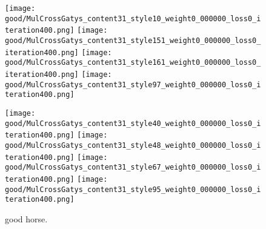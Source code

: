 \documentclass[runningheads]{llncs}
\begin{document}
\begin{figure*}[!htbp]
\centering
\small 

	\texttt{[image: good/MulCrossGatys\_content31\_style10\_weight0\_000000\_loss0\_iteration400.png]}
    \texttt{[image: good/MulCrossGatys\_content31\_style151\_weight0\_000000\_loss0\_iteration400.png]}
    \texttt{[image: good/MulCrossGatys\_content31\_style161\_weight0\_000000\_loss0\_iteration400.png]}
    \texttt{[image: good/MulCrossGatys\_content31\_style97\_weight0\_000000\_loss0\_iteration400.png]}
    
    \texttt{[image: good/MulCrossGatys\_content31\_style40\_weight0\_000000\_loss0\_iteration400.png]}
    \texttt{[image: good/MulCrossGatys\_content31\_style48\_weight0\_000000\_loss0\_iteration400.png]}
    \texttt{[image: good/MulCrossGatys\_content31\_style67\_weight0\_000000\_loss0\_iteration400.png]}
    \texttt{[image: good/MulCrossGatys\_content31\_style95\_weight0\_000000\_loss0\_iteration400.png]}
\caption{good horse.  }
\label{fig:good1}
\end{figure*}
\end{document}

